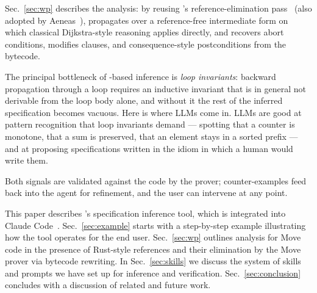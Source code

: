 Sec.~\ref{sec:wp} describes the analysis: by reusing \MVP's reference-elimination pass~\cite{DillGPQXZ22} (also adopted by Aeneas~\cite{Aeneas}), \WP propagates over a reference-free intermediate form on which classical Dijkstra-style reasoning applies directly, and recovers abort conditions, modifies clauses, and consequence-style postconditions from the bytecode.

The principal bottleneck of \WP-based inference is \emph{loop invariants}: backward propagation through a loop requires an inductive invariant that is in general not derivable from the loop body alone, and without it the rest of the inferred specification becomes vacuous.
Here is where LLMs come in. LLMs are good at pattern recognition that loop invariants demand --- spotting that a counter is monotone, that a sum is preserved, that an element stays in a sorted prefix --- and at proposing specifications written in the idiom in which a human would write them.

Both signals are validated against the code by the prover; counter-examples feed back into the agent for refinement, and the user can intervene at any point.

This paper describes \MVP's specification inference tool, which is integrated into Claude Code~\cite{ClaudeCode}.
Sec.~\ref{sec:example} starts with a step-by-step example illustrating how the tool operates for the end user.
Sec.~\ref{sec:wp} outlines \WP analysis for Move code in the presence of Rust-style references and their elimination by the Move prover via bytecode rewriting.
In Sec.~\ref{sec:skills} we discuss the system of skills and prompts we have set up for inference and verification.
Sec.~\ref{sec:conclusion} concludes with a discussion of related and future work.



